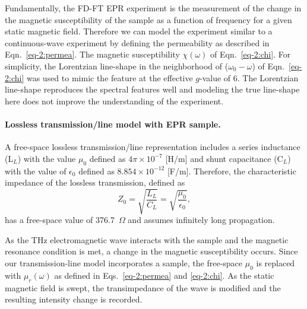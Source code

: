 Fundamentally, the FD-FT EPR experiment is the measurement of the change in the magnetic susceptibility of the sample as a function of frequency for a given static magnetic field. Therefore we can model the experiment similar to a continuous-wave experiment by defining the permeability as described in Eqn.~\ref{eq-2:permea}. The magnetic susceptibility $\chi(\omega)$ of Eqn.~\ref{eq-2:chi}. For simplicity, the Lorentzian line-shape in the neighborhood of ($\omega_0-\omega$) of Eqn.~\ref{eq-2:chi} was used to mimic the feature at the effective $g$-value of 6. The Lorentzian line-shape reproduces the spectral features well and modeling the true line-shape here does not improve the understanding of the experiment. 

\noindent \paragraph*{Lossless transmission\-/line model with EPR sample.} A free-space lossless transmission\-/line representation includes a series inductance (L$_L$) with the value $\mu_0$ defined as $4 \pi \times 10^{-7}$ [H/m] and shunt capacitance (C$_L$) with the value of $\epsilon_0$ defined as $8.854 \times 10^{-12}$ [F/m]. \cite{ramo1984fields} Therefore, the characteristic impedance of the lossless transmission, defined as
\begin{equation}
    Z_0 = \sqrt{\frac{L_L}{C_L}} = \sqrt{\frac{\mu_0}{\epsilon_0}},
\end{equation}
has a free-space value of 376.7~$\Omega$ and assumes infinitely long propagation. 

As the THz electromagnetic wave interacts with the sample and the magnetic resonance condition is met, a change in the magnetic susceptibility occurs. Since our transmission-line model incorporates a sample, the free-space $\mu_0$ is replaced with $\mu_r(\omega)$ as defined in Eqs.~\ref{eq-2:permea} and \ref{eq-2:chi}. As the static magnetic field is swept, the transimpedance of the wave is modified and the resulting intensity change is recorded.


